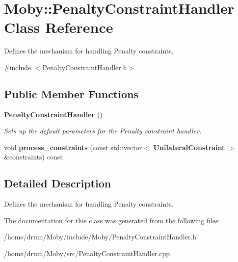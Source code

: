 \section{Moby\-:\-:Penalty\-Constraint\-Handler Class Reference}
\label{classMoby_1_1PenaltyConstraintHandler}


Defines the mechanism for handling Penalty constraints.  




{\ttfamily \#include $<$Penalty\-Constraint\-Handler.\-h$>$}

\subsection*{Public Member Functions}
\begin{DoxyCompactItemize}
\item 
{\bf Penalty\-Constraint\-Handler} ()\label{classMoby_1_1PenaltyConstraintHandler_a3be02bf3562a8432b0cd020f39aae026}

\begin{DoxyCompactList}\small\item\em Sets up the default parameters for the Penalty constraint handler. \end{DoxyCompactList}\item 
void {\bfseries process\-\_\-constraints} (const std\-::vector$<$ {\bf Unilateral\-Constraint} $>$ \&constraints) const \label{classMoby_1_1PenaltyConstraintHandler_a779dba3e53057f3a824c63ba4f3564e1}

\end{DoxyCompactItemize}


\subsection{Detailed Description}
Defines the mechanism for handling Penalty constraints. 

The documentation for this class was generated from the following files\-:\begin{DoxyCompactItemize}
\item 
/home/drum/\-Moby/include/\-Moby/Penalty\-Constraint\-Handler.\-h\item 
/home/drum/\-Moby/src/Penalty\-Constraint\-Handler.\-cpp\end{DoxyCompactItemize}
